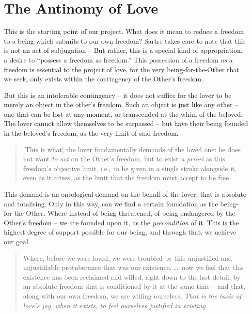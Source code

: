 \section{The Antinomy of Love}

This is the starting point of our project. What does it mean to reduce a freedom to a being which submits to our own freedom? Sartre takes care to note that this is not an act of subjugation -- 
But rather, this is a special kind of appropriation, a desire to \enquote{possess a freedom \emph{as} freedom.} This possession of a freedom \emph{as} a freedom is essential to the project of love, for the very being-for-the-Other that we seek, only exists within the contingency of the Other's freedom.

But this is an intolerable contingency -- it does not suffice for the lover to be merely an object in the other's freedom. Such an object is just like any other -- one that can be lost at any moment, or transcended at the whim of the beloved. The lover cannot allow themselves to be surpassed -- but have their being founded in the beloved's freedom, as the very limit of said freedom. 

\blockcquote[488]{Sartre}{[This is what] the lover fundamentally demands of the loved one: he does not want \emph{to act} on the Other's freedom, but to exist \emph{a priori} as this freedom's objective limit, i.e., to be given in a single stroke alongside it, even as it arises, as the limit that the freedom must accept to be free.}

\noindent
This demand is an ontological demand on the behalf of the lover, that is absolute and totalising.  Only in this way, can we find a certain foundation as the being-for-the-Other. Where instead of being threatened, of being endangered by the Other's freedom -- we are founded upon it, as the \emph{precondition} of it. This is the highest degree of support possible for our being, and through that, we achieve our goal.

\blockcquote[491]{Sartre}{Where, before we were loved, we were troubled by this unjustified and unjustifiable protuberance that was our existence, \ldots\ now we feel that this existence has been reclaimed and willed, right down to the last detail, by an absolute freedom that is conditioned by it at the same time -- and that, along with our own freedom, we are willing ourselves. \emph{That is the basis of love's joy, when it exists, to feel ourselves justified in existing}}

